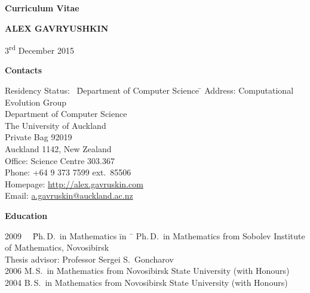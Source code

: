 \documentclass[12pt]{article}
\begin{document}
\centerline{\large \bf Curriculum Vitae}
\vskip5mm
\centerline{\Large \bfseries A\normalsize LEX \Large G\normalsize AVRYUSHKIN}
\vskip5mm
\centerline{3\textsuperscript{rd} December 2015}
\vskip5mm

\centerline{\bf Contacts}
\begin{tabbing}
Residency Status:     \  \= Department of Computer Science \= \kill
Address:        \> Computational Evolution Group \\
		\> Department of Computer Science \\
		\> The University of Auckland\\
		\> Private Bag 92019\\
		\> Auckland 1142, New Zealand\\
Office:		\> Science Centre 303.367\\
Phone:		\> +64 9 373 7599 ext.\ 85506\\
Homepage:	\> \href{http://alex.gavruskin.com}{http://alex.gavruskin.com}\\
Email:		\> \href{mailto:a.gavruskin@auckland.ac.nz}{a.gavruskin@auckland.ac.nz}\\
\iftoggle{full}{
Residency Status: \>New Zealand permanent resident\\
Date of Birth:	\>  18\textsuperscript{th} January 1983\\
}{}
\end{tabbing}

\centerline{\bf Education}
\begin{tabbing}
2009 \ \ \= Ph.\,D.\ in Mathematics \= in \ \=        \> Ph.\,D.\ in Mathematics \>  from Sobolev Institute of Mathematics, Novosibirsk\\
                \>             \>  Thesis advisor: Professor Sergei S.\ Goncharov\\
2006       \> M.\,S.\ in Mathematics \>  from Novosibirsk State University (with Honours)\\
2004       \> B.\,S.\ in Mathematics \>  from Novosibirsk State University (with Honours)\\
\iftoggle{full}{
2000       \> Gold Medal High School Diploma, Novokuznetsk%
}{}
\end{tabbing}
\end{document}
